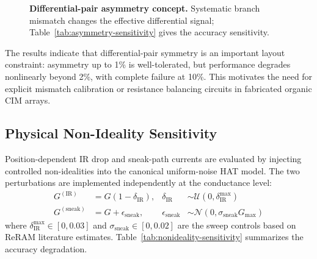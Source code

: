 \begin{figure}[ht]
    \centering
    \resizebox{0.90\textwidth}{!}{}
    \caption{\textbf{Differential-pair asymmetry concept.}
    Systematic branch mismatch changes the effective differential signal; Table~\ref{tab:asymmetry-sensitivity} gives the accuracy sensitivity.}
    \label{fig:supp-asymmetry-concept}
\end{figure}

The results indicate that differential-pair symmetry is an important layout constraint: asymmetry up to 1\% is well-tolerated, but performance degrades nonlinearly beyond 2\%, with complete failure at 10\%. This motivates the need for explicit mismatch calibration or resistance balancing circuits in fabricated organic CIM arrays.

\subsection{Physical Non-Ideality Sensitivity}
\label{subsec:supp-nonideality-sensitivity}

Position-dependent IR drop and sneak-path currents are evaluated by injecting controlled non-idealities into the canonical uniform-noise HAT model. The two perturbations are implemented independently at the conductance level:
\begin{align}
G^{(\mathrm{IR})} &= G \left(1 - \delta_{\mathrm{IR}}\right),
& \delta_{\mathrm{IR}} &\sim \mathcal{U}(0, \delta_{\mathrm{IR}}^{\max}) \\
G^{(\mathrm{sneak})} &= G + \epsilon_{\mathrm{sneak}},
& \epsilon_{\mathrm{sneak}} &\sim \mathcal{N}\!\left(0, \sigma_{\mathrm{sneak}} G_{\max}\right)
\end{align}
where $\delta_{\mathrm{IR}}^{\max} \in [0, 0.03]$ and $\sigma_{\mathrm{sneak}} \in [0, 0.02]$ are the sweep controls based on ReRAM literature estimates. Table~\ref{tab:nonideality-sensitivity} summarizes the accuracy degradation.


